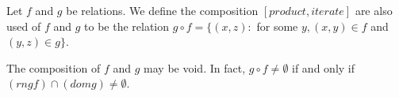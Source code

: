 Let $f$ and $g$ be relations. We define the composition $[product, iterate]$ are also used of $f$ and $g$ to be the relation $g \circ f = \{(x, z) :$ for some $y, (x, y) \in f$ and $(y, z) \in g\}$.

The composition of $f$ and $g$ may be void. In fact, $g \circ f \neq \emptyset$ if and only if $(rngf) \cap (domg) \neq \emptyset$.